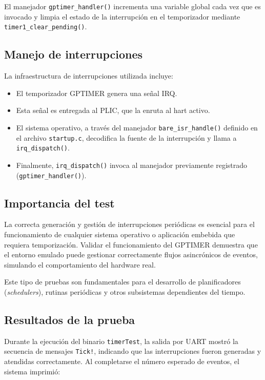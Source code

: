 El manejador \texttt{gptimer\_handler()} incrementa una variable global cada vez que es invocado y limpia el estado de la interrupción en el temporizador mediante \texttt{timer1\_clear\_pending()}.

\subsection*{Manejo de interrupciones}

La infraestructura de interrupciones utilizada incluye:

\begin{itemize}
    \item El temporizador GPTIMER genera una señal IRQ.
    \item Esta señal es entregada al PLIC, que la enruta al hart activo.
    \item El sistema operativo, a través del manejador \texttt{bare\_isr\_handle()} definido en el archivo \texttt{startup.c}, decodifica la fuente de la interrupción y llama a \texttt{irq\_dispatch()}.
    \item Finalmente, \texttt{irq\_dispatch()} invoca al manejador previamente registrado (\texttt{gptimer\_handler()}).
\end{itemize}

\subsection*{Importancia del test}

La correcta generación y gestión de interrupciones periódicas es esencial para el funcionamiento de cualquier sistema operativo o aplicación embebida que requiera temporización. Validar el funcionamiento del GPTIMER demuestra que el entorno emulado puede gestionar correctamente flujos asincrónicos de eventos, simulando el comportamiento del hardware real.

Este tipo de pruebas son fundamentales para el desarrollo de planificadores (\emph{schedulers}), rutinas periódicas y otros subsistemas dependientes del tiempo.

\subsection*{Resultados de la prueba}

Durante la ejecución del binario \texttt{timerTest}, la salida por UART mostró la secuencia de mensajes \texttt{Tick!}, indicando que las interrupciones fueron generadas y atendidas correctamente. Al completarse el número esperado de eventos, el sistema imprimió:

